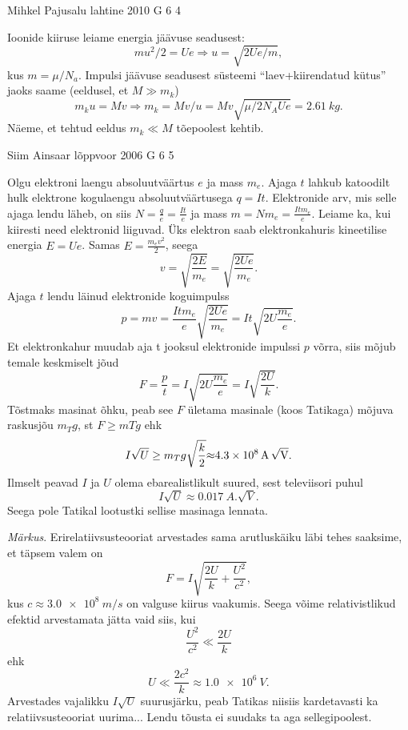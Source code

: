 \documentclass[11pt]{article}
\begin{document}
{%
{Mihkel Pajusalu} %
{lahtine} %
{2010} %
{G 6} %
{4} %
{

\ifSolution
Ioonide kiiruse leiame energia jäävuse seadusest:
$$mu^2/2=Ue \Rightarrow u=\sqrt{2Ue/m},$$
kus $m=\mu/N_a$.
Impulsi jäävuse seadusest süsteemi ``laev+kiirendatud kütus'' jaoks saame (eeldusel, et $M\gg m_k$)
$$m_ku=Mv \Rightarrow m_k=Mv/u=Mv\sqrt{\mu/2N_AUe}=\SI{2,61}{kg}.$$
Näeme, et tehtud eeldus $m_k\ll M$ tõepoolest kehtib.
\fi
}

{Siim Ainsaar} %
{lõppvoor} %
{2006} %
{G 6} %
{5} %
{

\ifSolution
Olgu elektroni laengu absoluutväärtus $e$ ja mass $m_e$. Ajaga $t$ lahkub katoodilt hulk elektrone kogulaengu absoluutväärtusega $q = It$. Elektronide arv, mis selle ajaga lendu läheb, on siis $N = \frac{q}{e} = \frac{It}{e}$ ja mass $m = Nm_e = \frac{Itm_e}{e}$. Leiame ka, kui kiiresti need elektronid liiguvad. Üks elektron saab elektronkahuris kineetilise energia $E = Ue$. Samas $E = \frac{m_ev^2}{2}$, seega
\[
v=\sqrt{\frac{2 E}{m_{e}}}=\sqrt{\frac{2 U e}{m_{e}}}. 
\]
Ajaga $t$ lendu läinud elektronide koguimpulss
\[
p=m v=\frac{I t m_{e}}{e} \sqrt{\frac{2 U e}{m_{e}}}=I t \sqrt{2 U \frac{m_{e}}{e}}.
\]
Et elektronkahur muudab aja t jooksul elektronide impulssi $p$ võrra, siis mõjub temale keskmiselt jõud
\[
F=\frac{p}{t}=I \sqrt{2 U \frac{m_{e}}{e}}=I \sqrt{\frac{2 U}{k}}.
\] 
Tõstmaks masinat õhku, peab see $F$ ületama masinale (koos Tatikaga) mõjuva raskusjõu $m_T g$, st $F \geq mT g$ ehk
\[
I \sqrt{U} \geq m_{T} g \sqrt{\frac{k}{2}} \SI{\approx 4,3e8}{A.\sqrt{V}}. 
\]
Ilmselt peavad $I$ ja $U$ olema ebarealistlikult suured, sest televiisori puhul 
\[
I \sqrt U \approx \SI{0,017}{A.\sqrt{V}}.
\]
Seega pole Tatikal lootustki sellise masinaga lennata.

\emph{Märkus}. Erirelatiivsusteooriat arvestades sama arutluskäiku läbi tehes saaksime, et täpsem valem on 
\[
F=I \sqrt{\frac{2 U}{k}+\frac{U^{2}}{c^{2}}},
\]
kus $c \approx \SI{3,0e8}{m/s}$ on valguse kiirus vaakumis. Seega võime relativistlikud efektid arvestamata jätta vaid siis, kui 
\[
\frac{U^2}{c^2} \ll \frac{2U}{k}
\]
ehk 
\[
U \ll \frac{2 c^{2}}{k} \approx \SI{1,0e6}{V}.
\] 
Arvestades vajalikku $I \sqrt U$ suurusjärku, peab Tatikas niisiis kardetavasti ka relatiivsusteooriat uurima... Lendu tõusta ei suudaks ta aga sellegipoolest.
\fi
}

}
\end{document}
